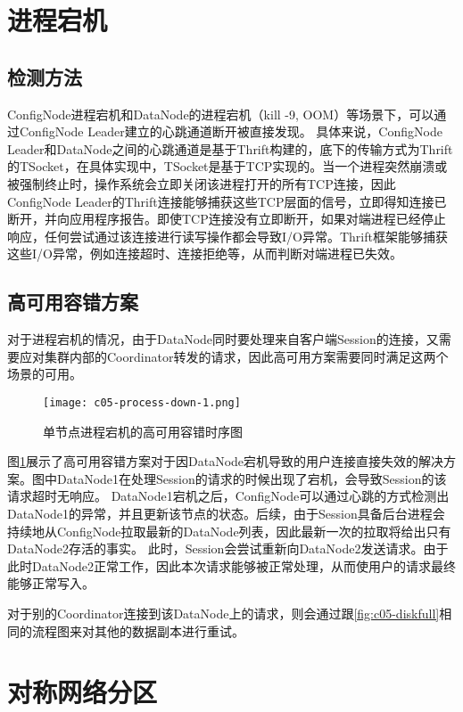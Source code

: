 \section{进程宕机}

\subsection{检测方法}
ConfigNode进程宕机和DataNode的进程宕机（kill -9, OOM）等场景下，可以通过ConfigNode Leader建立的心跳通道断开被直接发现。
具体来说，ConfigNode Leader和DataNode之间的心跳通道是基于Thrift构建的，底下的传输方式为Thrift的TSocket，在具体实现中，TSocket是基于TCP实现的。当一个进程突然崩溃或被强制终止时，操作系统会立即关闭该进程打开的所有TCP连接，因此ConfigNode Leader的Thrift连接能够捕获这些TCP层面的信号，立即得知连接已断开，并向应用程序报告。即使TCP连接没有立即断开，如果对端进程已经停止响应，任何尝试通过该连接进行读写操作都会导致I/O异常。Thrift框架能够捕获这些I/O异常，例如连接超时、连接拒绝等，从而判断对端进程已失效。

\subsection{高可用容错方案}

对于进程宕机的情况，由于DataNode同时要处理来自客户端Session的连接，又需要应对集群内部的Coordinator转发的请求，因此高可用方案需要同时满足这两个场景的可用。

\begin{figure}
    \centering
    \texttt{[image: c05-process-down-1.png]}
    \caption{单节点进程宕机的高可用容错时序图}
    \label{fig:c05-process-down-1}
\end{figure}

图\ref{fig:c05-process-down-1}展示了高可用容错方案对于因DataNode宕机导致的用户连接直接失效的解决方案。图中DataNode1在处理Session的请求的时候出现了宕机，会导致Session的该请求超时无响应。
DataNode1宕机之后，ConfigNode可以通过心跳的方式检测出DataNode1的异常，并且更新该节点的状态。后续，由于Session具备后台进程会持续地从ConfigNode拉取最新的DataNode列表，因此最新一次的拉取将给出只有DataNode2存活的事实。
此时，Session会尝试重新向DataNode2发送请求。由于此时DataNode2正常工作，因此本次请求能够被正常处理，从而使用户的请求最终能够正常写入。


对于别的Coordinator连接到该DataNode上的请求，则会通过跟\ref{fig:c05-diskfull}相同的流程图来对其他的数据副本进行重试。

\section{对称网络分区}

